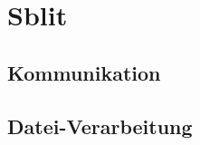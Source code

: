 \chapter{Sblit}
\renewcommand{\kapitelautor}{Autor: Nikola Szucsich}

\section{Kommunikation}\label{kommunikation}


\section{Datei-Verarbeitung}\label{dateiverarbeitung}

